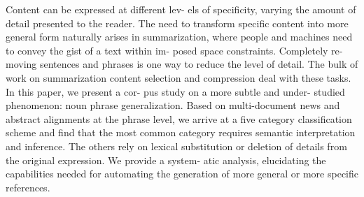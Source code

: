 Content can be expressed at different lev- els of specificity, varying the amount of detail presented to the reader. The need to transform specific content into more general form naturally arises in summarization, where people and machines need to convey the gist of a text within im- posed space constraints. Completely re- moving sentences and phrases is one way to reduce the level of detail. The bulk of work on summarization content selection and compression deal with these tasks. In this paper, we present a cor- pus study on a more subtle and under- studied phenomenon: noun phrase generalization. Based on multi-document news and abstract alignments at the phrase level, we arrive at a five category classification scheme and find that the most common category requires semantic interpretation and inference. The others rely on lexical substitution or deletion of details from the original expression. We provide a system- atic analysis, elucidating the capabilities needed for automating the generation of more general or more specific references.

